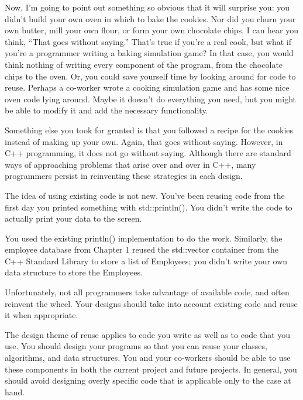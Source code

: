 Now, I’m going to point out something so obvious that it will surprise you: you didn’t build your own oven in which to bake the cookies. Nor did you churn your own butter, mill your own flour, or form your own chocolate chips. I can hear you think, “That goes without saying.” That’s true if you’re a real cook, but what if you’re a programmer writing a baking simulation game? In that case, you would think nothing of writing every component of the program, from the chocolate chips to the oven. Or, you could save yourself time by looking around for code to reuse. Perhaps a co-worker wrote a cooking simulation game and has some nice oven code lying around. Maybe it doesn’t do everything you need, but you might be able to modify it and add the necessary functionality.

Something else you took for granted is that you followed a recipe for the cookies instead of making up your own. Again, that goes without saying. However, in C++ programming, it does not go without saying. Although there are standard ways of approaching problems that arise over and over in C++, many programmers persist in reinventing these strategies in each design.

The idea of using existing code is not new. You’ve been reusing code from the first day you printed something with std::println(). You didn’t write the code to actually print your data to the screen.

You used the existing println() implementation to do the work. Similarly, the employee database from Chapter 1 reused the std::vector container from the C++ Standard Library to store a list of Employees; you didn’t write your own data structure to store the Employees.

Unfortunately, not all programmers take advantage of available code, and often reinvent the wheel. Your designs should take into account existing code and reuse it when appropriate.


The design theme of reuse applies to code you write as well as to code that you use. You should design your programs so that you can reuse your classes, algorithms, and data structures. You and your co-workers should be able to use these components in both the current project and future projects. In general, you should avoid designing overly specific code that is applicable only to the case at hand.

